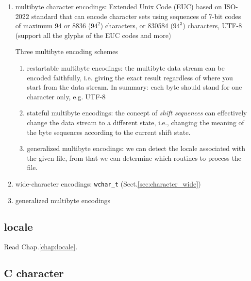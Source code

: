 \begin{enumerate}
  \item multibyte character encodings: Extended Unix Code (EUC) based on
  ISO-2022 standard that can encode character sets using sequences of 7-bit
  codes of maximum 94 or 8836 ($94^2$) characters, or 830584 ($94^3$)
  characters, UTF-8 (support all the glyphs of the EUC codes and more)
  
  Three multibyte encoding schemes
  \begin{enumerate}
    \item restartable multibyte encodings: the multibyte data stream can be
    encoded faithfully, i.e. giving the exact result regardless of where you
    start from the data stream. In summary: each byte should stand for one
    character only, e.g. UTF-8
    
    \item stateful multibyte encodings: the concept of {\it shift sequences} can
    effectively change the data stream to a different state, i.e., changing the
    meaning of the byte sequences according to the current shift state.
    
    \item generalized multibyte encodings: we can detect the locale associated
    with the given file, from that we can determine which routines to process
    the file. 
  \end{enumerate}
  
  \item wide-character encodings: \verb!wchar_t! (Sect.\ref{sec:character_wide})

  \item generalized multibyte encodings
\end{enumerate}


\subsection{locale}
\label{sec:locale}

Read Chap.\ref{chap:locale}.


\subsection{C character}
\label{sec:C_character}
\label{sec:char}

